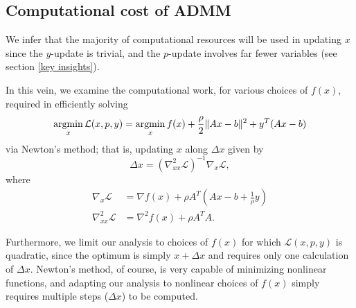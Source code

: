 \documentclass{article}
\newcommand{\inv}[1]{\frac{1}{#1}}
\begin{document}
\subsection{Computational cost of ADMM}
We infer that the majority of computational resources 
    will be used in updating $x$ since
    the $y$-update is trivial, and
    the $p$-update involves far fewer variables 
    (see section \ref{key insights}).

In this vein, we examine the computational work, for various choices of $f(x)$,
    required in efficiently solving
    \begin{equation}
    \mathop{\rm argmin}_x \mathcal{L}(x,p,y) = 
        \mathop{\rm argmin}_x f(x) + \frac{\rho}{2}\|Ax - b\|^2 + y^T(Ax - b)
    \end{equation}
    via Newton's method; that is, updating $x$ along $\Delta x$ given by
    \begin{equation}
    \Delta x = (\nabla_{xx}^2 \mathcal{L})^{-1} \nabla_x \mathcal{L},
    \end{equation}
    where
    \begin{subequations}\begin{align}
    \nabla_x \mathcal{L} &= \nabla f(x) + \rho A^T (A x - b + \inv{\rho}y) \\
    \nabla_{xx}^2 \mathcal{L} &= \nabla^2 f(x) + \rho A^T A.
    \end{align}\end{subequations}

Furthermore, we limit our analysis to choices of $f(x)$ for which 
    $\mathcal{L}(x,p,y)$ is quadratic,
    since the optimum is simply $x + \Delta x$ and
    requires only one calculation of $\Delta x$.
Newton's method, of course, is very capable of minimizing nonlinear functions,
    and adapting our analysis to nonlinear choices of $f(x)$ 
    simply requires multiple steps ($\Delta x$) to be computed.
\end{document}
